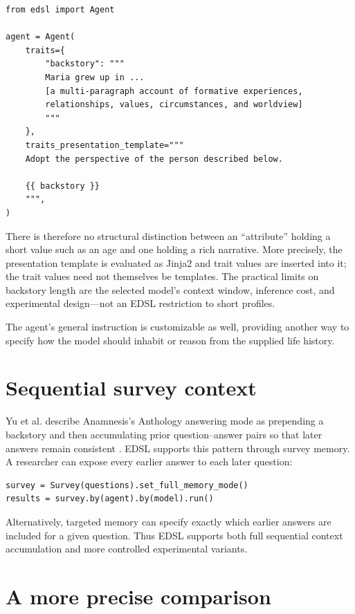 \documentclass[11pt]{article}
\begin{document}
\begin{lstlisting}[style=python]
from edsl import Agent

agent = Agent(
    traits={
        "backstory": """
        Maria grew up in ...
        [a multi-paragraph account of formative experiences,
        relationships, values, circumstances, and worldview]
        """
    },
    traits_presentation_template="""
    Adopt the perspective of the person described below.

    {{ backstory }}
    """,
)
\end{lstlisting}

There is therefore no structural distinction between an ``attribute'' holding
a short value such as an age and one holding a rich narrative. More precisely,
the presentation template is evaluated as Jinja2 and trait values are inserted
into it; the trait values need not themselves be templates. The practical
limits on backstory length are the selected model's context window, inference
cost, and experimental design---not an EDSL restriction to short profiles.

The agent's general instruction is customizable as well, providing another
way to specify how the model should inhabit or reason from the supplied life
history.

\section{Sequential survey context}

Yu et al. describe Anamnesis's Anthology answering mode as prepending a
backstory and then accumulating prior question--answer pairs so that later
answers remain consistent \cite{yu2026anamnesis}. EDSL supports this pattern
through survey memory. A researcher can expose every earlier answer to each
later question:

\begin{lstlisting}[style=python]
survey = Survey(questions).set_full_memory_mode()
results = survey.by(agent).by(model).run()
\end{lstlisting}

Alternatively, targeted memory can specify exactly which earlier answers are
included for a given question. Thus EDSL supports both full sequential context
accumulation and more controlled experimental variants.

\section{A more precise comparison}
\end{document}
